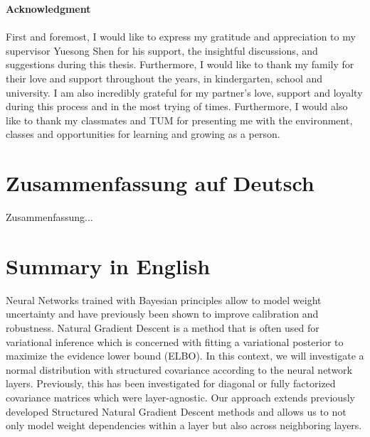 \documentclass[a4paper, 11pt, oneside]{scrartcl}
\theoremstyle{break}
\numberwithin{equation}{section}
\begin{document}
	\thispagestyle{empty}
	\vspace*{2.2cm}
	\noindent %
	{\Huge {\textbf{Acknowledgment}}} \\
	\vspace*{1.6cm} \\
	\pagestyle{headings}
		First and foremost, I would like to express my gratitude and appreciation to my supervisor Yuesong Shen for his support, the insightful discussions, and suggestions during this thesis.
		Furthermore, I would like to thank my family for their love and support throughout the years, in kindergarten, school and university.
		I am also incredibly grateful for my partner's love, support and loyalty during this process and in the most trying of times. 
		Furthermore, I would also like to thank my classmates and TUM for presenting me with the environment, classes and opportunities for learning and growing as a person. 

	\newpage

	\thispagestyle{empty}
	\section*{Zusammenfassung auf Deutsch}
		Zusammenfassung...

	\section*{Summary in English}
		Neural Networks trained with Bayesian principles allow to model weight uncertainty and have previously been shown to improve calibration and robustness. 
		Natural Gradient Descent is a method that is often used for variational inference which is concerned with fitting a variational posterior to maximize the evidence lower bound (ELBO).
		In this context, we will investigate a normal distribution with structured covariance according to the neural network layers.
		Previously, this has been investigated for diagonal or fully factorized covariance matrices which were layer-agnostic.
		Our approach extends previously developed Structured Natural Gradient Descent methods and allows us to not only model weight dependencies within a layer but also across neighboring layers.
	\newpage

	\thispagestyle{empty}
	\tableofcontents
	\thispagestyle{empty}
	\newpage

	\pagestyle{fancy}
\end{document}
